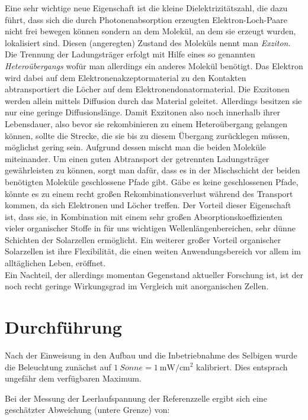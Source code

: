 \documentclass[slug=SZ, room=Hermann-Krone-Bau\,\ Labor\ 1.25, supervisor=Martin\ Kroll]{../../Lab_Report_LaTeX/lab_report}
\newcommand{\sun}[1]{\SI{#1}{Sonne}}
\newcommand{\mwcm}[1]{\SI{#1}{\milli\watt\per\centi\meter^2}}
\begin{document}
Eine sehr wichtige neue Eigenschaft ist die kleine Dielektrizitätszahl, die dazu führt, dass sich die durch
Photonenabsorption erzeugten Elektron-Loch-Paare nicht frei bewegen können sondern an dem Molekül, an dem sie
erzeugt wurden, lokalisiert sind. Diesen (angeregten) Zustand des Moleküls nennt man \emph{Exziton}.
Die Trennung der Ladungsträger erfolgt mit Hilfe eines so genannten \emph{Heteroübergangs} wofür man allerdings
ein anderes Molekül benötigt. Das Elektron wird dabei auf dem Elektronenakzeptormaterial zu den Kontakten
abtransportiert die Löcher auf dem Elektronendonatormaterial.
Die Exzitonen werden allein mittels Diffusion durch das Material geleitet. Allerdings besitzen sie nur eine
geringe Diffusionslänge. Damit Exzitonen also noch innerhalb ihrer Lebensdauer, also bevor sie rekombinieren
zu einem Heteroübergang gelangen können, sollte die Strecke, die sie bis zu diesem Übergang zurücklegen müssen,
möglichst gering sein. Aufgrund dessen mischt man die beiden Moleküle miteinander.
Um einen guten Abtransport der getrennten Ladungsträger gewährleisten zu können, sorgt man dafür, dass es in der
Mischschicht der beiden benötigten Moleküle geschlossene Pfade gibt. Gäbe es keine geschlossenen Pfade, könnte
es zu einem recht großen Rekombinationsverlust während des Transport kommen, da sich Elektronen und Löcher
treffen.
Der Vorteil dieser Eigenschaft ist, dass sie, in Kombination mit einem sehr großen Absorptionskoeffizienten
vieler organischer Stoffe in für uns wichtigen Wellenlängenbereichen, sehr dünne Schichten der Solarzellen
ermöglicht.
Ein weiterer großer Vorteil organischer Solarzellen ist ihre Flexibilität, die einen weiten Anwendungsbereich
vor allem im alltäglichen Leben, eröffnet.\\

Ein Nachteil, der allerdings momentan Gegenstand aktueller Forschung ist, ist der noch recht geringe
Wirkungsgrad im Vergleich mit anorganischen Zellen.


\section{Durchf\"uhrung}
\label{sec:durchf}

Nach der Einweisung in den Aufbau und die Inbetriebnahme des Selbigen
wurde die Beleuchtung zun\"achst auf $\sun{1}=\mwcm{1}$
kalibriert. Dies entsprach ungef\"ahr dem verf\"ugbaren Maximum.

Bei der Messung der Leerlaufspannung der Referenzzelle ergibt sich eine
gesch\"atzter Abweichung (untere Grenze) von:
\end{document}
